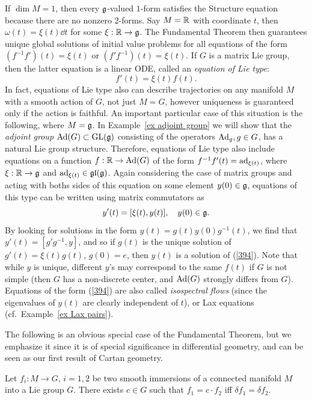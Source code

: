 \begin{example}
    If $\dim M=1$, then every $\mathfrak{g}$-valued $1$-form satisfies the Structure equation because there are no nonzero $2$-forms. Say $M=\mathbb{R}$ with coordinate $t$, then $\omega(t)=\xi(t)\dd t$ for some $\xi:\mathbb{R}\to \mathfrak{g}$. The Fundamental Theorem then guarantees unique global solutions of initial value problems for all equations of the form $(f^{-1}f')(t)=\xi(t)$ or $(f'f^{-1})(t)=\xi(t)$. If $G$ is a matrix Lie group, then the latter equation is a linear ODE, called an \emph{equation of Lie type}:
    \[f'(t)=\xi(t)f(t).\]
    In fact, equations of Lie type also can describe trajectories on any manifold $M$ with a smooth action of $G$, not just $M=G$, however uniqueness is guaranteed only if the action is faithful. An important particular case of this situation is the following, where $M=\mathfrak{g}$. In Example~\ref{ex adjoint group} we will show that the \emph{adjoint group} $\mathrm{Ad}(G)\subset \operatorname{GL}(\mathfrak{g})$ consisting of the operators $\mathrm{Ad}_g,g\in G$, has a natural Lie group structure. Therefore, equations of Lie type also include equations on a function $f:\mathbb{R}\to \mathrm{Ad}(G)$ of the form $f^{-1}f'(t)=\mathrm{ad}_{\xi(t)}$, where $\xi:\mathbb{R}\to \mathfrak{g}$ and $\mathrm{ad}_{\xi(t)}\in \mathfrak{gl}(\mathfrak{g})$. Again considering the case of matrix groups and acting with boths sides of this equation on some element $y(0)\in \mathfrak{g}$, equations of this type can be written using matrix commutators as 
    \[y'(t)=[\xi(t),y(t)],\quad y(0)\in\mathfrak{g}.\label{394}\]
    By looking for solutions in the form $y(t)=g(t)y(0)g^{-1}(t)$, we find that $y'(t)=[g'g^{-1},y]$, and so if $g(t)$ is the unique solution of $g'(t)=\xi(t)g(t)$, $g(0)=e$, then $y(t)$ is a solution of (\ref{394}). Note that while $y$ is unique, different $y$'s may correspond to the same $f(t)$ if $G$ is not simple (then $G$ has a non-discrete center, and $\mathrm{Ad}(G)$ strongly differs from $G$). Equations of the form (\ref{394}) are also called \emph{isospectral flows} (since the eigenvalues of $y(t)$ are clearly independent of $t$), or Lax equations (cf.\ Example~\ref{ex Lax pairs}).
\end{example}

The following is an obvious special case of the Fundamental Theorem, but we emphasize it since it is of special significance in differential geometry, and can be seen as our first result of Cartan geometry.

\begin{cor}\label{cor immersions into G}
    Let $f_i:M\to G$, $i=1,2$ be two smooth immersions of a connected manifold $M$ into a Lie group $G$. There exists $c\in G$ such that $f_1=c\cdot f_2$ iff $\delta f_1=\delta f_2$.
\end{cor}


